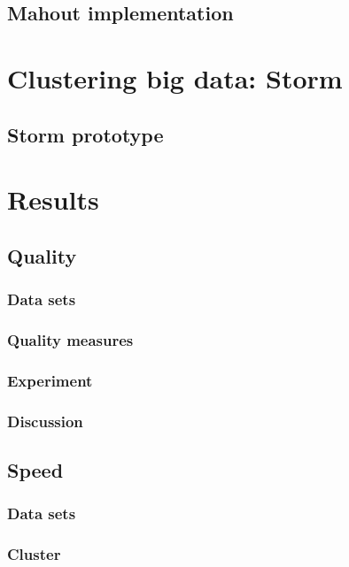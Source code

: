 \documentclass{article}
\begin{document}
\subsection{Mahout implementation}

\section{Clustering big data: Storm}

\subsection{Storm prototype}

\section{Results}

\subsection{Quality}

\subsubsection{Data sets}

\subsubsection{Quality measures}

\subsubsection{Experiment}

\subsubsection{Discussion}

\subsection{Speed}

\subsubsection{Data sets}

\subsubsection{Cluster}
\end{document}
